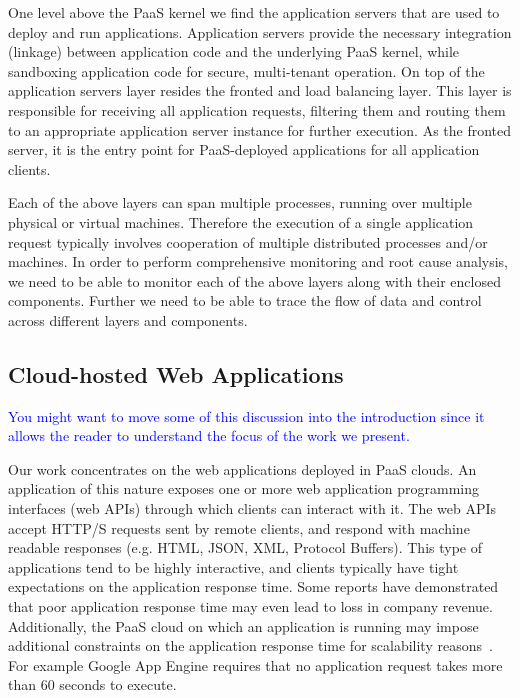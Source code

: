 One level above the PaaS kernel we find the application servers that are used to deploy and run
applications. Application servers provide the necessary integration (linkage) between application code and the
underlying PaaS kernel, while sandboxing application code for secure, multi-tenant operation. On top
of the application servers layer resides the fronted and load balancing layer. This layer is responsible
for receiving all application requests, filtering them and routing them to an appropriate application
server instance for further execution. As the fronted server, it is the entry point for PaaS-deployed
applications for all application clients.

Each of the above layers can span multiple processes, running over multiple physical or virtual
machines. Therefore the execution of a single application request typically involves cooperation
of multiple distributed processes and/or machines. In order to perform comprehensive monitoring
and root cause analysis, we need to be able to monitor each of the above layers along with their
enclosed components. Further we need to be able to trace the flow of data and control
across different layers and components.

\subsection{Cloud-hosted Web Applications} 

\textcolor{blue}{You might want to move some of this discussion into the
introduction since it allows the reader to understand the focus of the work we
present.}

Our work concentrates on the web
applications deployed in PaaS clouds. An application of this nature exposes
one or more web application programming interfaces (web APIs) through which
clients can interact with it. The web APIs accept HTTP/S requests sent by
remote clients, and respond with machine readable responses (e.g. HTML, JSON,
XML, Protocol Buffers). This type of applications tend to be highly
interactive, and clients typically have tight expectations on the application
response time. Some reports have demonstrated that poor application response
time may even lead to loss in company revenue. Additionally, the PaaS cloud on
which an application is running may impose additional constraints on the
application response time for scalability
reasons~\cite{azure-limits,gae-limits}.  For example Google App Engine
requires that no application request takes more than 60 seconds to execute.

